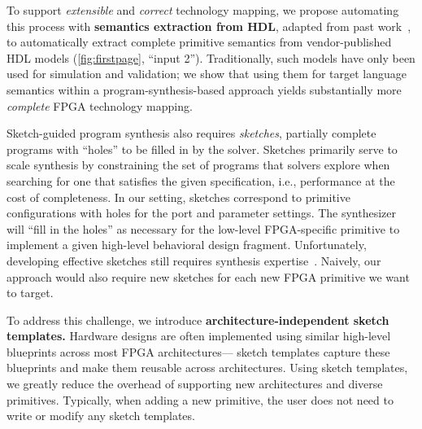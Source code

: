 To support
  \textit{extensible} and \textit{correct}
  technology mapping, we propose
  automating this process with
  \textbf{semantics extraction from HDL}, 
  adapted from past work~\cite{daly2022synthesizing},
  to automatically extract
  complete primitive semantics
  from vendor-published HDL models
  (\cref{fig:firstpage}, ``input 2'').
Traditionally, such models have
   only been used
  for simulation and validation;
  we show that using them for
  target language semantics within a
  program-synthesis-based approach
  yields substantially more
  \textit{complete} FPGA technology mapping.

Sketch-guided program synthesis also
  requires \textit{sketches},
  partially complete programs with ``holes'' to be filled in
  by the solver.
Sketches primarily serve to
  scale synthesis by
  constraining the set of programs that 
  solvers explore when searching for
  one that satisfies
  the given specification,
  i.e., performance at the cost of completeness.
In our setting,
  sketches correspond to
  primitive configurations with
  holes for the port and parameter settings.
The synthesizer will ``fill in the holes''
  as necessary for
  the low-level FPGA-specific primitive to implement
  a given high-level behavioral design fragment.
Unfortunately,
  developing effective sketches
  still requires synthesis expertise~\cite{10.1145/3140587.3062353,vanGeffenJITSynth}.
  Naively, our approach would also
  require new sketches for each new
  FPGA primitive we want to target.



 
To address this challenge, 
  we introduce
  \textbf{architecture-independent sketch templates.}
Hardware designs are often implemented
  using similar high-level blueprints
  across most FPGA architectures---%
  sketch templates
  capture these blueprints
  and make them reusable across architectures.
Using sketch templates, we
  greatly reduce the overhead of supporting
  new architectures and
  diverse primitives.
Typically, when adding
  a new primitive, the user
  does not need to write or modify
  any sketch templates.


